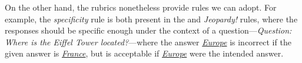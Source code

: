 %



%

%



On the other hand, the rubrics nonetheless provide rules we can adopt.
%
For example, the \textit{specificity} rule is
both present in the  and \textit{Jeopardy!} rules, where the
responses should be specific enough under the context of a
question---\textit{Question: Where is the Eiffel Tower located?}---where the
answer \textit{\uline{Europe}} is incorrect if the given  answer is
\textit{\uline{France}}, but is acceptable if \textit{\uline{Europe}} were the
intended answer.



